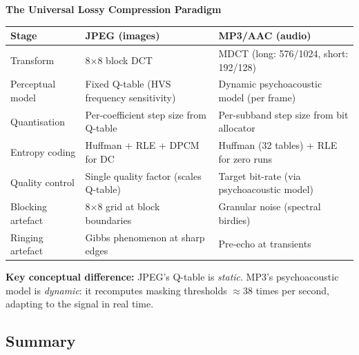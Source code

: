 \begin{connectionbox}
\textbf{The Universal Lossy Compression Paradigm}

\begin{center}
\setlength{\tabcolsep}{5pt}
\begin{tabular}{lll}
\toprule
\textbf{Stage} & \textbf{JPEG (images)} & \textbf{MP3/AAC (audio)} \\
\midrule
Transform &
  8$\times$8 block DCT &
  MDCT (long: 576/1024, short: 192/128) \\
Perceptual model &
  Fixed Q-table (HVS frequency sensitivity) &
  Dynamic psychoacoustic model (per frame) \\
Quantisation &
  Per-coefficient step size from Q-table &
  Per-subband step size from bit allocator \\
Entropy coding &
  Huffman + RLE + DPCM for DC &
  Huffman (32 tables) + RLE for zero runs \\
Quality control &
  Single quality factor (scales Q-table) &
  Target bit-rate (via psychoacoustic model) \\
\midrule
Blocking artefact &
  8$\times$8 grid at block boundaries &
  Granular noise (spectral birdies) \\
Ringing artefact &
  Gibbs phenomenon at sharp edges &
  Pre-echo at transients \\
\bottomrule
\end{tabular}
\end{center}

\textbf{Key conceptual difference:} JPEG's Q-table is \emph{static}. MP3's psychoacoustic model is \emph{dynamic}: it recomputes masking thresholds $\approx$38 times per second, adapting to the signal in real time.
\end{connectionbox}

\subsection{Summary}

